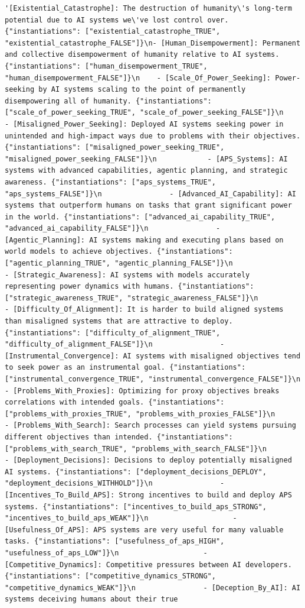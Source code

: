 \documentclass[
  11pt,
  letterpaper,
]{book}
\begin{document}
\begin{verbatim}
'[Existential_Catastrophe]: The destruction of humanity\'s long-term potential due to AI systems we\'ve lost control over. {"instantiations": ["existential_catastrophe_TRUE", "existential_catastrophe_FALSE"]}\n- [Human_Disempowerment]: Permanent and collective disempowerment of humanity relative to AI systems. {"instantiations": ["human_disempowerment_TRUE", "human_disempowerment_FALSE"]}\n    - [Scale_Of_Power_Seeking]: Power-seeking by AI systems scaling to the point of permanently disempowering all of humanity. {"instantiations": ["scale_of_power_seeking_TRUE", "scale_of_power_seeking_FALSE"]}\n        - [Misaligned_Power_Seeking]: Deployed AI systems seeking power in unintended and high-impact ways due to problems with their objectives. {"instantiations": ["misaligned_power_seeking_TRUE", "misaligned_power_seeking_FALSE"]}\n            - [APS_Systems]: AI systems with advanced capabilities, agentic planning, and strategic awareness. {"instantiations": ["aps_systems_TRUE", "aps_systems_FALSE"]}\n                - [Advanced_AI_Capability]: AI systems that outperform humans on tasks that grant significant power in the world. {"instantiations": ["advanced_ai_capability_TRUE", "advanced_ai_capability_FALSE"]}\n                - [Agentic_Planning]: AI systems making and executing plans based on world models to achieve objectives. {"instantiations": ["agentic_planning_TRUE", "agentic_planning_FALSE"]}\n                - [Strategic_Awareness]: AI systems with models accurately representing power dynamics with humans. {"instantiations": ["strategic_awareness_TRUE", "strategic_awareness_FALSE"]}\n            - [Difficulty_Of_Alignment]: It is harder to build aligned systems than misaligned systems that are attractive to deploy. {"instantiations": ["difficulty_of_alignment_TRUE", "difficulty_of_alignment_FALSE"]}\n                - [Instrumental_Convergence]: AI systems with misaligned objectives tend to seek power as an instrumental goal. {"instantiations": ["instrumental_convergence_TRUE", "instrumental_convergence_FALSE"]}\n                - [Problems_With_Proxies]: Optimizing for proxy objectives breaks correlations with intended goals. {"instantiations": ["problems_with_proxies_TRUE", "problems_with_proxies_FALSE"]}\n                - [Problems_With_Search]: Search processes can yield systems pursuing different objectives than intended. {"instantiations": ["problems_with_search_TRUE", "problems_with_search_FALSE"]}\n            - [Deployment_Decisions]: Decisions to deploy potentially misaligned AI systems. {"instantiations": ["deployment_decisions_DEPLOY", "deployment_decisions_WITHHOLD"]}\n                - [Incentives_To_Build_APS]: Strong incentives to build and deploy APS systems. {"instantiations": ["incentives_to_build_aps_STRONG", "incentives_to_build_aps_WEAK"]}\n                    - [Usefulness_Of_APS]: APS systems are very useful for many valuable tasks. {"instantiations": ["usefulness_of_aps_HIGH", "usefulness_of_aps_LOW"]}\n                    - [Competitive_Dynamics]: Competitive pressures between AI developers. {"instantiations": ["competitive_dynamics_STRONG", "competitive_dynamics_WEAK"]}\n                - [Deception_By_AI]: AI systems deceiving humans about their true 
\end{verbatim}
\end{document}
